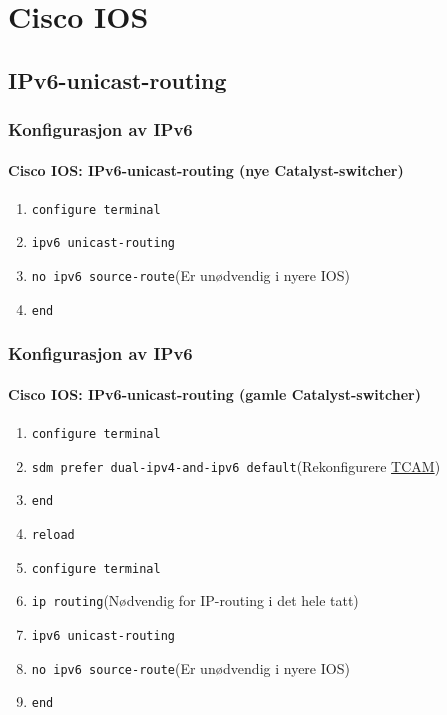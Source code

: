 \section{Cisco IOS}
\subsection{IPv6-unicast-routing}
\begin{frame}%
  \frametitle{Konfigurasjon av IPv6}
  \framesubtitle{Cisco IOS: IPv6-unicast-routing (nye Catalyst-switcher)}
  \begin{enumerate}%
  \item \texttt{configure terminal}
  \item \alert{\texttt{ipv6 unicast-routing}}
  \item \texttt{no ipv6 source-route}\hfill(Er unødvendig i nyere IOS)
  \item \texttt{end}
  \end{enumerate}
\end{frame}

\begin{frame}%
  \frametitle{Konfigurasjon av IPv6}
  \framesubtitle{Cisco IOS: IPv6-unicast-routing (gamle Catalyst-switcher)}
  \begin{enumerate}%
  \item \texttt{configure terminal}
  \item \alert{\texttt{sdm prefer dual-ipv4-and-ipv6 default}}\hfill(Rekonfigurere \href{http://en.wikipedia.org/wiki/Content-addressable_memory}{TCAM})
  \item \texttt{end}
  \item \texttt{reload}
  \item \texttt{configure terminal}
  \item \alert{\texttt{ip routing}}\hfill(Nødvendig for IP-routing i det hele tatt)
  \item \alert{\texttt{ipv6 unicast-routing}}
  \item \texttt{no ipv6 source-route}\hfill(Er unødvendig i nyere IOS)
  \item \texttt{end}
  \end{enumerate}
\end{frame}

